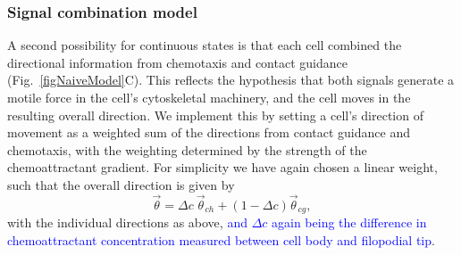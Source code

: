 \documentclass[review]{elsarticle}
\newcommand\hl[1]{{\textcolor{blue}{#1}}}
\begin{document}
\subsubsection{Signal combination model\label{methodsSignalCombination}}
A second possibility for continuous states is that each cell combined the directional information from chemotaxis and contact guidance (Fig.~\ref{figNaiveModel}C). This reflects the hypothesis that both signals generate a motile force in the cell's cytoskeletal machinery, and the cell moves in the resulting overall direction. We implement this by setting a cell's direction of movement as a weighted sum of the directions from contact guidance and chemotaxis, with the weighting determined by the strength of the chemoattractant gradient. For simplicity we have again chosen a linear weight, such that the overall direction is given by 
\begin{equation} \label{eqnCombination}
	\vec{\theta} = \Delta c\ \vec{\theta}_{ch} + (1 - \Delta c)\vec{\theta}_{cg},
\end{equation}
with the individual directions as above, \hl{and $\Delta c$ again being the difference in chemoattractant concentration measured between cell body and  filopodial tip}.
\end{document}
